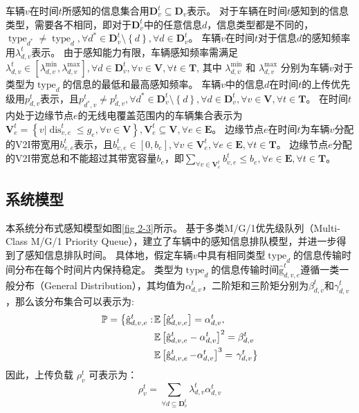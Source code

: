 车辆$v$在时间$t$所感知的信息集合用$\mathbf{D}_v^t\subseteq \mathbf{D}_v$表示。
对于车辆在时间$t$感知到的信息类型，需要各不相同，即对于$\mathbf{D}_v^t$中的任意信息$d$，信息类型都是不同的，$\operatorname{type}_{d^*} \neq \operatorname{type}_{d}, \forall d^* \in \mathbf{D}_v^t \setminus \left\{ d\right \}, \forall d \in \mathbf{D}_v^t$。
车辆$v$在时间$t$对于信息$d$的感知频率用$\lambda_{d,v}^t$表示。
由于感知能力有限，车辆感知频率需满足$\lambda_{d,v}^{t} \in [\lambda_{d,v}^{\min} , \lambda_{d,v}^{\max} ], \forall d \in \mathbf{D}_v^t, \forall v \in \mathbf{V}, \forall t \in \mathbf{T}$, 其中 $\lambda_{d,v}^{\min}$ 和 $\lambda_{d,v}^{\max}$ 分别为车辆$v$对于类型为$\operatorname{type}_{d}$的信息的最低和最高感知频率。
车辆$v$中的信息$d$在时间$t$的上传优先级用$p_{d,v}^t$表示，且${p}_{d^*, v}^t \neq {p}_{d, v}^t, \forall d^* \in \mathbf{D}_v^t \setminus \left\{ d\right \}, \forall d \in \mathbf{D}_v^t, \forall v \in \mathbf{V}, \forall t \in \mathbf{T}$。
在时间$t$内处于边缘节点$e$的无线电覆盖范围内的车辆集合表示为$\mathbf{V}_e^t=\left \{v \vert \operatorname{dis}_{v,e}^t \leq g_e, \forall v \in \mathbf{V} \right \}, \mathbf{V}_e^t \subseteq \mathbf{V}, \forall e \in \mathbf{E}$。
边缘节点$e$在时间$t$为车辆$v$分配的V2I带宽用$b_{v, e}^t$表示，且$b_{v, e}^t \in \left [0,b_e \right], \forall v \in \mathbf{V}_e^{t}, \forall e \in \mathbf{E}, \forall t \in \mathbf{T}$。
边缘节点$e$分配的V2I带宽总和不能超过其带宽容量$b_e$，即${\sum_{\forall v \in \mathbf{V}_e^{t}}b_{v, e}^t} \leq b_e, \forall e \in \mathbf{E}, \forall t \in \mathbf{T}$。

\subsection{系统模型}
本系统分布式感知模型如图\ref{fig 2-3}所示。
基于多类M/G/1优先级队列（Multi-Class M/G/1 Priority Queue）\cite{qian2020minimizing}，建立了车辆中的感知信息排队模型，并进一步得到了感知信息排队时间。
具体地，假定车辆$v$中具有相同类型$\operatorname{type}_d$的信息传输时间分布在每个时间片内保持稳定。
类型为$\operatorname{type}_d$的信息传输时间$\operatorname{\hat{g}}_{d, v, e}^t$遵循一类一般分布（General Distribution），其均值为$\alpha_{d, v}^t$，二阶矩和三阶矩分别为$\beta_{d, v}^t$和$\gamma_{d, v}^t$，那么该分布集合可以表示为:
\begin{align}
	\mathbb{P}=\left\{\hat{\mathrm{g}}_{d, v, e}^t:\right. & \mathbb{E}\left[\hat{\mathrm{g}}_{d, v, e}^t\right]=\alpha_{d, v}^t, \notag \\
	& \mathbb{E}\left[\hat{\mathrm{g}}_{d, v, e}^t-\alpha_{d, v}^t\right]^2=\beta_{d, v}^t \notag \\
	& \mathbb{E}\left[\operatorname{\hat{g}}_{d, v, e}^t-\alpha_{d, v}^t\right]^{3}=\left.\gamma_{d, v}^t \right\}
\end{align}
因此，上传负载 $\rho_{v}^{t}$ 可表示为：
\begin{equation}
    \rho_{v}^{t}=\sum_{\forall d \subseteq \mathbf{D}_v^t} \lambda_{d,v}^{t}  \alpha_{d, v}^t
\end{equation}

